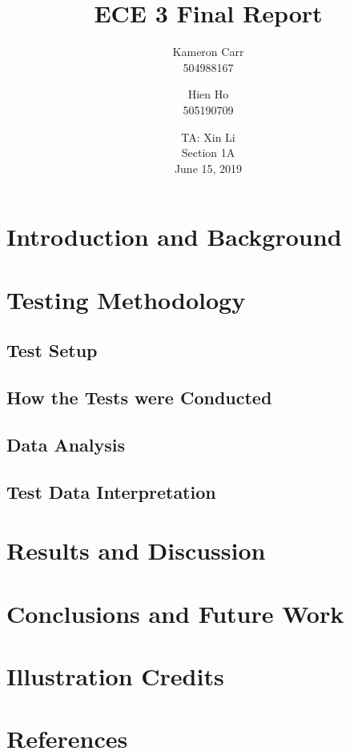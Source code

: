 \documentclass[12pt]{article}
\title{ECE 3 Final Report}
\author{Kameron Carr \\ 504988167 \and Hien Ho \\ 505190709}
\date{TA: Xin Li \\ Section 1A \\ June 15, 2019}
\begin{document}
\maketitle

\section{Introduction and Background}

\section{Testing Methodology}
\subsection{Test Setup}

\subsection{How the Tests were Conducted}

\subsection{Data Analysis}

\subsection{Test Data Interpretation}


\section{Results and Discussion}

\section{Conclusions and Future Work}

\section{Illustration Credits}

\section{References}
\end{document}
